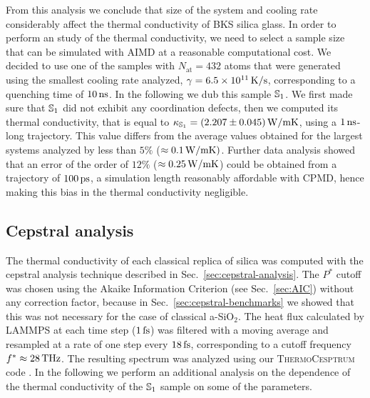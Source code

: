 From this analysis we conclude that size of the system and cooling rate considerably affect the thermal conductivity of BKS silica glass. 
In order to perform an \abinitio study of the thermal conductivity, we need to select a sample size that can be simulated with AIMD at a reasonable computational cost. 
We decided to use one of the samples with $N_{\mathrm{at}}=432$ atoms that were generated using the smallest cooling rate analyzed, $\gamma=6.5\times 10^{11}\,\mathrm{K/s}$, corresponding to a quenching time of $10\,\mathrm{ns}$. In the following we dub this sample $\S1$. 
We first made sure that $\S1$ did not exhibit any coordination defects, then we computed its thermal conductivity, that is equal to $\kappa_\S1 = (2.207 \pm 0.045) \un{W/mK}$, using a $1\,\mathrm{ns}$-long trajectory. 
This value differs from the average values obtained for the largest systems analyzed by less than $5\%$ ($\approx 0.1\,\mathrm{W/mK})$. 
Further data analysis showed that an error of the order of $12\%$ ($\approx 0.25\,\mathrm{W/mK}$) could be obtained from a trajectory of $100\,\mathrm{ps}$, a simulation length reasonably affordable with CPMD, hence making this bias in the thermal conductivity negligible. 



\subsection{Cepstral analysis}  \label{sec:results-class-cepstral}
The thermal conductivity of each classical replica of silica was computed with the cepstral analysis technique described in Sec.~\ref{sec:cepstral-analysis}. 
The $P^*$ cutoff was chosen using the Akaike Information Criterion (see Sec.~\ref{sec:AIC}) without any correction factor, because in Sec.~\ref{sec:cepstral-benchmarks} we showed that this was not necessary for the case of classical a-SiO$_2$. 
The heat flux calculated by \textsc{LAMMPS} at each time step ($1\,\mathrm{fs}$) was filtered with a moving average and resampled at a rate of one step every $18\,\mathrm{fs}$, corresponding to a cutoff frequency $f^*\approx 28\,\mathrm{THz}$. The resulting spectrum was analyzed using our \textsc{ThermoCesptrum} code \cite{thermocepstrum}.
In the following we perform an additional analysis on the dependence of the thermal conductivity of the $\S1$ sample on some of the parameters. 

